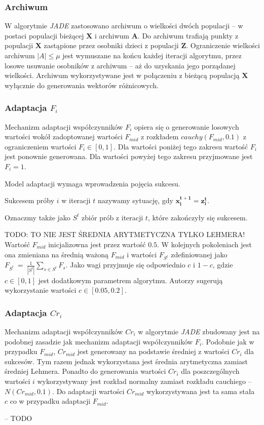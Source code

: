 \documentclass[12pt,a4paper]{report}
\begin{document}
{{{\begin{description}
\subsubsection{Archiwum}
\par{
W algorytmie \emph{JADE} zastosowano archiwum o wielkości dwóch populacji -- w postaci populacji bieżącej $\mathbf{X}$ i archiwum $\mathbf{A}$. Do archiwum trafiają punkty z populacji $\mathbf{X}$ zastąpione przez osobniki dzieci z populacji $\mathbf{Z}$. Ograniczenie wielkości archiwum $|A| \le \mu$ jest wymuszane na końcu każdej iteracji algorytmu, przez losowe usuwanie osobników z archiwum -- aż do uzyskania jego porządanej wielkości. Archiwum wykorzystywane jest w połączeniu z bieżącą populacją $\mathbf{X}$ wyłącznie do generowania wektorów różnicowych.
}
\subsubsection{Adaptacja $F_i$}
\par{
Mechanizm adaptacji współczynników $F_i$ opiera się o generowanie losowych wartości wokół zadoptowanej wartości $F_{mid}$ z rozkładem $cauchy(F_{mid}, 0.1)$ z ograniczeniem wartości $F_i \in [0, 1]$. Dla wartości poniżej tego zakresu wartość $F_i$ jest ponownie generowana. Dla wartości powyżej tego zakresu przyjmowane jest $F_i = 1$.
}
\par{
Model adaptacji wymaga wprowadzenia pojęcia sukcesu.
\par{
\begin{OptDefinition}
Sukcesem próby $i$ w iteracji $t$ nazywamy sytuację, gdy $\mathbf{x_i^{t+1} = z_i^t}$.
\end{OptDefinition}
}
Oznaczmy także jako $S^t$ zbiór prób z iteracji $t$, które zakończyły się sukcesem.
}
\par{
TODO: TO NIE JEST ŚREDNIA ARYTMETYCZNA TYLKO LEHMERA!
Wartość $F_{mid}$ inicjalizowna jest przez wartość $0.5$. W kolejnych pokoleniach jest ona zmieniana na średnią ważoną $F_{mid}$ i wartości $F_{S^t}$ zdefiniowanej jako $F_{S^t}~=~\frac{1}{|S^t|}\sum_{s \in S^t} F_s$. Jako wagi przyjmuje się odpowiednio $c$ i $1 - c$, gdzie $c \in [0,1]$ jest dodatkowym parametrem algorytmu. Autorzy \cite{JADE} sugerują wykorzystanie wartości $c \in [0.05, 0.2]$.
}

\subsubsection{Adaptacja $Cr_i$}
\par{
Mechanizm adaptacji współczynników $Cr_i$ w algorytmie \emph{JADE} zbudowany jest na podobnej zasadzie jak mechanizm adaptacji współczynników $F_i$. Podobnie jak w przypadku $F_{mid}$, $Cr_{mid}$ jest generowany na podstawie średniej z wartości $Cr_i$ dla sukcesów. Tym razem jednak wykorzystana jest średnia arytmetyczna zamiast średniej Lehmera. Ponadto do generowania wartości $Cr_i$ dla poszczególnych wartości $i$ wykorzystywany jest rozkład normalny zamiast rozkładu cauchiego -- $N(Cr_{mid}, 0.1)$. Do adaptacji wartości $Cr_{mid}$ wykorzystywana jest ta sama stała $c$ co w przypadku adaptacji $F_{mid}$.
}
\item[SHADE] -- TODO
\end{description}

}}}
\end{document}
